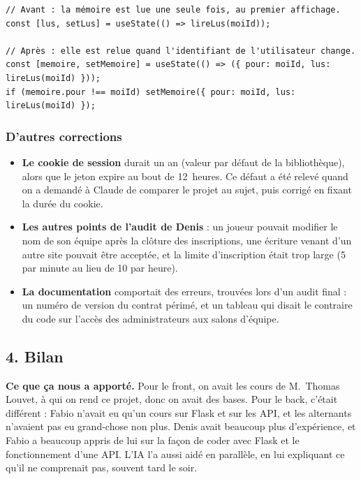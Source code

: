 \documentclass[11pt,a4paper]{article}
\begin{document}
\begin{blocode}
\begin{Verbatim}
// Avant : la mémoire est lue une seule fois, au premier affichage.
const [lus, setLus] = useState(() => lireLus(moiId));

// Après : elle est relue quand l'identifiant de l'utilisateur change.
const [memoire, setMemoire] = useState(() => ({ pour: moiId, lus: lireLus(moiId) }));
if (memoire.pour !== moiId) setMemoire({ pour: moiId, lus: lireLus(moiId) });
\end{Verbatim}
\end{blocode}

\subsubsection*{D'autres corrections}

\begin{itemize}
  \item \textbf{Le cookie de session} durait un an (valeur par défaut de la bibliothèque), alors que le jeton expire au bout de 12~heures. Ce défaut a été relevé quand on a demandé à Claude de comparer le projet au sujet, puis corrigé en fixant la durée du cookie.
  \item \textbf{Les autres points de l'audit de Denis} : un joueur pouvait modifier le nom de son équipe après la clôture des inscriptions, une écriture venant d'un autre site pouvait être acceptée, et la limite d'inscription était trop large (5 par minute au lieu de 10 par heure).
  \item \textbf{La documentation} comportait des erreurs, trouvées lors d'un audit final : un numéro de version du contrat périmé, et un tableau qui disait le contraire du code sur l'accès des administrateurs aux salons d'équipe.
\end{itemize}

\subsection*{4. Bilan}

\textbf{Ce que ça nous a apporté.} Pour le front, on avait les cours de M.~Thomas Louvet, à qui on rend ce projet, donc on avait des bases. Pour le back, c'était différent : Fabio n'avait eu qu'un cours sur Flask et sur les API, et les alternants n'avaient pas eu grand-chose non plus. Denis avait beaucoup plus d'expérience, et Fabio a beaucoup appris de lui sur la façon de coder avec Flask et le fonctionnement d'une API. L'IA l'a aussi aidé en parallèle, en lui expliquant ce qu'il ne comprenait pas, souvent tard le soir.
\end{document}
